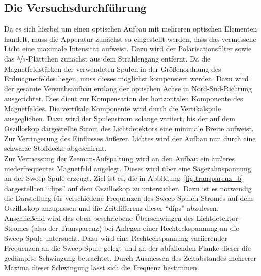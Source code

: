 \documentclass[
  bibliography=totoc,     %
  captions=tableheading,  %
  titlepage=firstiscover, %
]{scrartcl}
\begin{document}
\subsection{Die Versuchsdurchführung}

Da es sich hierbei um einen optischen Aufbau mit mehreren optischen Elementen
handelt, muss die Apperatur zunächst so eingestellt werden, dass das vermessene
Licht eine maximale Intensität aufweist. Dazu wird der Polarisationsfilter
sowie das $\sfrac{\lambda}{4}$-Plättchen zunächst aus dem Strahlengang entfernt.
Da die Magnetfeldstärken der verwendeten Spulen in der Größenordnung des
Erdmagnetfeldes liegen, muss dieses möglichst kompensiert werden. Dazu wird der
gesamte Versuchsaufbau entlang der optischen Achse in Nord-Süd-Richtung
ausgerichtet. Dies dient zur Kompensation der horizontalen Komponente des
Magnetfeldes. Die vertikale Komponente wird durch die Vertikalspule
ausgeglichen. Dazu wird der Spulenstrom solange variiert, bis der auf dem
Oszilloskop dargestellte Strom des Lichtdetektors eine minimale Breite aufweist.
Zur Verringerung des Einflusses äußeren Lichtes wird der Aufbau nun durch eine
schwarze Stoffdecke abgeschirmt.\\ Zur Vermessung der Zeeman-Aufspaltung wird an
den Aufbau ein äußeres niederfrequentes Magnetfeld angelegt. Dieses wird über
eine Sägezahnspannung an der Sweep-Spule erzeugt. Ziel ist es, die in
Abbildung~\ref{fig:transparenz_b} dargestellten \enquote{dips} auf dem
Oszilloskop zu untersuchen. Dazu ist es notwendig die Darstellung für
verschiedene Frequenzen des Sweep-Spulen-Stromes auf dem Oszilloskop anzupassen
und die Zeitdifferenz dieser \enquote{dips} abzulesen.\\ Anschließend wird das
oben beschriebene Überschwingen des Lichtdetektor-Stromes (also der Transparenz)
bei Anlegen einer Rechteckspannung an die Sweep-Spule untersucht. Dazu wird eine
Rechteckspannung variierender Frequenzen an die Sweep-Spule gelegt und an der
abfallenden Flanke dieser die gedämpfte Schwingung betrachtet. Durch Ausmessen
des Zeitabstandes mehrerer Maxima dieser Schwingung lässt sich die Frequenz
bestimmen.
\end{document}
